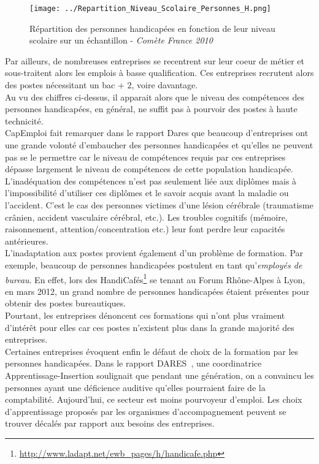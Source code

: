 \begin{figure}[H]
\centering
\texttt{[image: ../Repartition\_Niveau\_Scolaire\_Personnes\_H.png]}
\caption{Répartition des personnes handicapées en fonction de leur niveau scolaire sur un échantillon - \textit{Comète France 2010}}
\end{figure}

Par ailleurs, de nombreuses entreprises se recentrent sur leur coeur de métier et sous-traitent alors les emplois à basse qualification. Ces entreprises recrutent alors des postes nécessitant un bac + 2, voire davantage.\\

Au vu des chiffres ci-dessus, il apparait alors que le niveau des compétences des personnes handicapées, en général, ne suffit pas à pourvoir des postes à haute technicité.\\
CapEmploi fait remarquer dans le rapport Dares que beaucoup d'entreprises ont une grande volonté d'embaucher des personnes handicapées et qu'elles ne peuvent pas se le permettre car le niveau de compétences requis par ces entreprises dépasse largement le niveau de compétences de cette population handicapée.\\

L'inadéquation des compétences n'est pas seulement liée aux diplômes mais à l'impossibilité d'utiliser ces diplômes et le savoir acquis avant la maladie ou l'accident. C'est le cas des personnes victimes d'une lésion cérébrale (traumatisme crânien, accident vasculaire cérébral, etc.). Les troubles cognitifs (mémoire, raisonnement, attention/concentration etc.) leur font perdre leur capacités antérieures. \\

L'inadaptation aux postes provient également d'un problème de formation. Par exemple, beaucoup de personnes handicapées postulent en tant qu'\textit{employés de bureau}. En effet, lors des HandiCafés\footnote{\url{http://www.ladapt.net/ewb_pages/h/handicafe.php}} se tenant au Forum Rhône-Alpes à Lyon, en mars 2012, un grand nombre de personnes handicapées étaient présentes pour obtenir des postes bureautiques.\\
Pourtant, les entreprises dénoncent ces formations qui n'ont plus vraiment d'intérêt pour elles car ces postes n'existent plus dans la grande majorité des entreprises.\\

Certaines entreprises évoquent enfin le défaut de choix de la formation par les personnes handicapées.
Dans le rapport DARES~\cite{etudeDares1}, une coordinatrice Apprentissage-Insertion soulignait que pendant une génération, on a convaincu les personnes ayant une déficience auditive qu'elles pourraient faire de la comptabilité. Aujourd'hui, ce secteur est moins pourvoyeur d'emploi. Les choix d'apprentissage proposés par les organismes d'accompagnement peuvent se trouver décalés par rapport aux besoins des entreprises.

